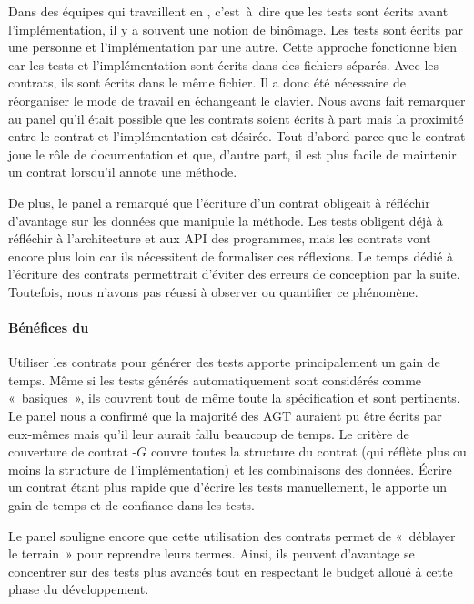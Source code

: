 Dans des équipes qui travaillent en ,
c'est~à~dire que les tests sont écrits avant l'implémentation, il y a souvent
une notion de binômage. Les tests sont écrits par une personne et
l'implémentation par une autre. Cette approche fonctionne bien car les tests et
l'implémentation sont écrits dans des fichiers séparés. Avec les contrats, ils
sont écrits dans le même fichier. Il a donc été nécessaire de réorganiser le
mode de travail en échangeant le clavier. Nous avons fait remarquer au panel
qu'il était possible que les contrats soient écrits à part mais la proximité
entre le contrat et l'implémentation est désirée. Tout d'abord parce que le
contrat joue le rôle de documentation et que, d'autre part, il est plus facile
de maintenir un contrat lorsqu'il annote une méthode.

De plus, le panel a remarqué que l'écriture d'un contrat obligeait à réfléchir
d'avantage sur les données que manipule la méthode. Les tests obligent déjà à
réfléchir à l'architecture et aux API des programmes, mais les contrats vont
encore plus loin car ils nécessitent de formaliser ces réflexions. Le temps
dédié à l'écriture des contrats permettrait d'éviter des erreurs de conception
par la suite. Toutefois, nous n'avons pas réussi à observer ou quantifier ce
phénomène.

\paragraph{Bénéfices du } Utiliser les
contrats pour générer des tests apporte principalement un gain de temps. Même si
les tests générés automatiquement sont considérés comme «~basiques~», ils
couvrent tout de même toute la spécification et sont pertinents. Le panel nous a
confirmé que la majorité des AGT auraient pu être écrits par eux-mêmes mais
qu'il leur aurait fallu beaucoup de temps. Le critère de couverture de contrat
-$G$ couvre toutes la structure du contrat (qui réflète plus ou
moins la structure de l'implémentation) et les combinaisons des données. Écrire
un contrat étant plus rapide que d'écrire les tests manuellement, le
 apporte un gain de temps et de confiance dans
les tests.

Le panel souligne encore que cette utilisation des contrats permet de «~déblayer
le terrain~» pour reprendre leurs termes. Ainsi, ils peuvent d'avantage se
concentrer sur des tests plus avancés tout en respectant le budget alloué à
cette phase du développement.

